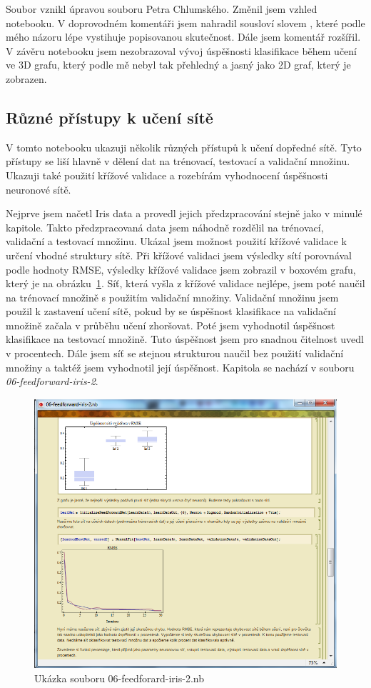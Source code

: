 \documentclass[11pt,twoside,a4paper]{book}
\begin{document}
Soubor vznikl úpravou souboru Petra Chlumského. Změnil jsem vzhled notebooku. V doprovodném komentáři jsem nahradil sousloví  slovem , které podle mého názoru lépe vystihuje popisovanou skutečnost. Dále jsem komentář rozšířil. V závěru notebooku jsem nezobrazoval vývoj úspěšnosti klasifikace během učení ve 3D grafu, který podle mě nebyl tak přehledný a jasný jako 2D graf, který je zobrazen.

\subsection{Různé přístupy k učení sítě}
V tomto notebooku ukazuji několik různých přístupů k učení dopředné sítě. Tyto přístupy se liší hlavně v dělení dat na trénovací, testovací a validační množinu. Ukazuji také použití křížové validace a rozebírám vyhodnocení úspěšnosti neuronové sítě.

Nejprve jsem načetl Iris data a provedl jejich předzpracování stejně jako v minulé kapitole. Takto předzpracovaná data jsem náhodně rozdělil na trénovací, validační a testovací množinu. Ukázal jsem možnost použití křížové validace k určení vhodné struktury sítě. Při křížové validaci jsem výsledky sítí porovnával podle hodnoty RMSE, výsledky křížové validace jsem zobrazil v boxovém grafu, který je na obrázku~\ref{fig:feedforward-iris-2}. Síť, která vyšla z křížové validace nejlépe, jsem poté naučil na trénovací množině s použitím validační množiny. Validační množinu jsem použil k zastavení učení sítě, pokud by se úspěšnost klasifikace na validační množině začala v průběhu učení zhoršovat. Poté jsem vyhodnotil úspěšnost klasifikace na testovací množině. Tuto úspěšnost jsem pro snadnou čitelnost uvedl v procentech. Dále jsem síť se stejnou strukturou naučil bez použití validační množiny a taktéž jsem vyhodnotil její úspěšnost. Kapitola se nachází v souboru \textit{06-feedforward-iris-2}.

\begin{figure}[h!]
\begin{center}
\includegraphics[height=10cm]{figures/ukazka06.png}
\caption{Ukázka souboru 06-feedforard-iris-2.nb}
\label{fig:feedforward-iris-2}
\end{center}
\end{figure}
\end{document}
